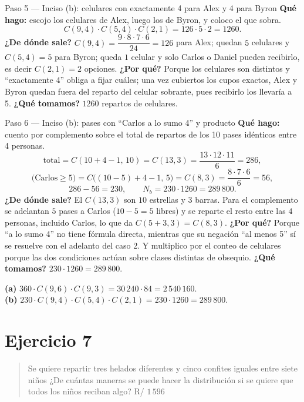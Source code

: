 \documentclass[11pt]{article}
\begin{document}
\begin{paso}{Paso 5 --- Inciso (b): celulares con exactamente 4 para Alex y 4 para Byron}
\textbf{Qué hago:} escojo los celulares de Alex, luego los de Byron, y coloco el que sobra.
\[
C(9,4)\cdot C(5,4)\cdot C(2,1)=126\cdot 5\cdot 2=1260 .
\]
\textbf{¿De dónde sale?} $C(9,4)=\dfrac{9\cdot8\cdot7\cdot6}{24}=126$ para Alex; quedan $5$ celulares y $C(5,4)=5$ para Byron; queda $1$ celular y solo Carlos o Daniel pueden recibirlo, es decir $C(2,1)=2$ opciones.
\textbf{¿Por qué?} Porque los celulares son distintos y ``exactamente 4'' obliga a fijar cuáles; una vez cubiertos los cupos exactos, Alex y Byron quedan fuera del reparto del celular sobrante, pues recibirlo los llevaría a 5.
\textbf{¿Qué tomamos?} $1260$ repartos de celulares.
\end{paso}

\begin{paso}{Paso 6 --- Inciso (b): pases con ``Carlos a lo sumo 4'' y producto}
\textbf{Qué hago:} cuento por complemento sobre el total de repartos de los 10 pases idénticos entre 4 personas.
\[
\text{total}=C(10+4-1,\,10)=C(13,3)=\frac{13\cdot 12\cdot 11}{6}=286,
\]
\[
\text{(Carlos}\ge 5)=C\bigl((10-5)+4-1,\,5\bigr)=C(8,3)=\frac{8\cdot7\cdot6}{6}=56,
\]
\[
286-56=230,\qquad N_b=230\cdot 1260=289\,800 .
\]
\textbf{¿De dónde sale?} El $C(13,3)$ son $10$ estrellas y $3$ barras. Para el complemento se adelantan $5$ pases a Carlos ($10-5=5$ libres) y se reparte el resto entre las $4$ personas, incluido Carlos, lo que da $C(5+3,3)=C(8,3)$.
\textbf{¿Por qué?} Porque ``a lo sumo 4'' no tiene fórmula directa, mientras que su negación ``al menos 5'' sí se resuelve con el adelanto del caso 2. Y multiplico por el conteo de celulares porque las dos condiciones actúan sobre clases distintas de obsequio.
\textbf{¿Qué tomamos?} $230\cdot 1260=289\,800$.
\end{paso}

\begin{resp}
\textbf{(a)} $360\cdot C(9,6)\cdot C(9,3)=30\,240\cdot 84=2\,540\,160$.\\
\textbf{(b)} $230\cdot C(9,4)\cdot C(5,4)\cdot C(2,1)=230\cdot 1260=289\,800$.
\end{resp}

\section*{Ejercicio 7}

\begin{quote}
Se quiere repartir tres helados diferentes y cinco confites iguales entre siete niños ¿De cuántas maneras se puede hacer la distribución si se quiere que todos los niños reciban algo? \hfill R/ $1\,596$
\end{quote}
\end{document}
